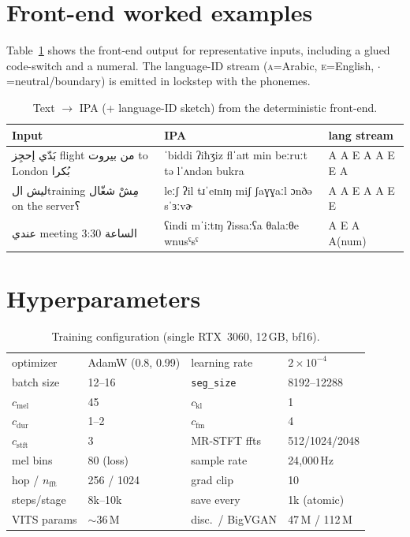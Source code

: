 \documentclass[10pt,twocolumn]{article}
\newcommand{\ipa}[1]{{\ipafont #1}}
\newcommand{\ar}[1]{{\arabicfont #1}}
\begin{document}
\section{Front-end worked examples}
\label{app:examples}
Table~\ref{tab:examples} shows the front-end output for representative inputs, including a
glued code-switch and a numeral. The language-ID stream (\textsc{a}=Arabic, \textsc{e}=English,
\(\cdot\)=neutral/boundary) is emitted in lockstep with the phonemes.

\begin{table}[h]
\centering\small
\caption{Text \(\rightarrow\) IPA (+ language-ID sketch) from the deterministic front-end.}
\label{tab:examples}
\begin{tabular}{p{} p{} p{}}
\toprule
\textbf{Input} & \textbf{IPA} & \textbf{lang stream}\\
\midrule
\ar{بَدّي إحجِز flight من بيروت to London بُكرا} &
\ipa{ˈbiddi ʔiħʒiz flˈaɪt min beːruːt tə lˈʌndən bukra} & A A E A A E E A\\
\ar{ليش الtraining مِشْ شغّال on the server؟} &
\ipa{leːʃ ʔil tɹˈeɪnɪŋ miʃ ʃaɣɣaːl ɔnðə sˈɜːvɚ} & A A E A A E E\\
\ar{عندي meeting الساعة 3:30} &
\ipa{ʕindi mˈiːtɪŋ ʔissaːʕa θalaːθe wnusˤsˤ} & A E A A(num)\\
\bottomrule
\end{tabular}
\end{table}

\section{Hyperparameters}
\label{app:hp}
\begin{table}[h]
\centering\small
\caption{Training configuration (single RTX~3060, 12\,GB, bf16).}
\label{tab:hp}
\begin{tabular}{ll ll}
\toprule
optimizer & AdamW (0.8, 0.99) & learning rate & \(2\times10^{-4}\)\\
batch size & 12--16 & \texttt{seg\_size} & 8192--12288\\
\(c_{\text{mel}}\) & 45 & \(c_{\text{kl}}\) & 1\\
\(c_{\text{dur}}\) & 1--2 & \(c_{\text{fm}}\) & 4\\
\(c_{\text{stft}}\) & 3 & MR-STFT ffts & 512/1024/2048\\
mel bins & 80 (loss) & sample rate & 24{,}000\,Hz\\
hop / \(n_\text{fft}\) & 256 / 1024 & grad clip & 10\\
steps/stage & 8k--10k & save every & 1k (atomic)\\
VITS params & \(\sim\)36\,M & disc.\ / BigVGAN & 47\,M / 112\,M\\
\bottomrule
\end{tabular}
\end{table}
\end{document}
